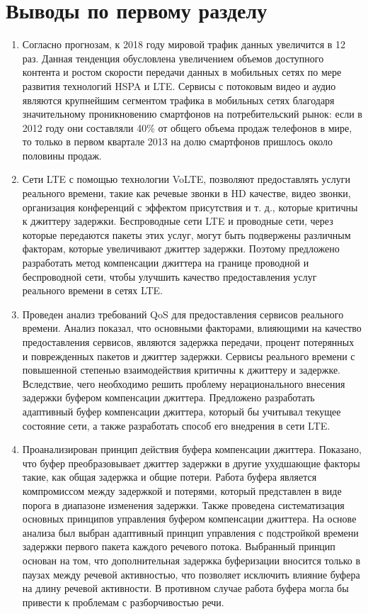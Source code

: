 \section{Выводы по первому разделу } \label{sect1_conclus}

\begin{enumerate}
\item Согласно прогнозам, к 2018 году мировой трафик данных увеличится в 12 раз. Данная тенденция обусловлена увеличением объемов доступного контента и ростом скорости передачи данных в мобильных сетях по мере развития технологий HSPA и LTE.
Сервисы с потоковым видео и аудио являются крупнейшим сегментом трафика в мобильных сетях благодаря значительному проникновению смартфонов на потребительский рынок:
если в 2012 году они составляли 40\% от общего объема продаж телефонов в мире, то только в первом квартале 2013 на долю смартфонов пришлось около половины продаж.
\item Сети LTE с помощью технологии VoLTE, позволяют предоставлять услуги реального времени, 
такие как речевые звонки в HD качестве, видео звонки, организация конференций с эффектом присутствия и т. д., которые критичны к джиттеру задержки. 
Беспроводные сети LTE и проводные сети, через которые передаются пакеты этих услуг, могут быть подвержены различным факторам, которые увеличивают джиттер задержки. 
Поэтому предложено разработать метод компенсации джиттера на границе проводной и беспроводной сети, чтобы улучшить качество предоставления услуг реального времени в сетях LTE.

\item Проведен анализ требований QoS для предоставления сервисов реального времени.
Анализ показал, что основными факторами, влияющими на качество предоставления сервисов, являются задержка передачи, процент потерянных и поврежденных пакетов и джиттер задержки.
Сервисы реального времени с повышенной степенью взаимодействия критичны к джиттеру и задержке. Вследствие, чего необходимо решить проблему нерационального внесения задержки буфером компенсации джиттера. 
Предложено разработать адаптивный буфер компенсации джиттера, который бы учитывал текущее состояние сети, а также разработать способ его внедрения  в сети LTE.
\item Проанализирован принцип действия буфера компенсации джиттера. 
Показано, что буфер преобразовывает джиттер задержки в другие ухудшающие факторы такие, как общая задержка и общие потери. 
Работа буфера является компромиссом между задержкой и потерями, который представлен в виде порога в диапазоне изменения задержки.
Также проведена систематизация основных принципов управления буфером компенсации джиттера. 
На основе анализа был выбран адаптивный принцип управления с подстройкой времени задержки первого пакета каждого речевого потока. 
Выбранный принцип основан на том, что дополнительная задержка буферизации вносится только в паузах между речевой активностью, что позволяет исключить влияние буфера на длину речевой активности.
В противном случае работа буфера могла бы привести к проблемам с разборчивостью речи.


\end{enumerate}

\clearpage




